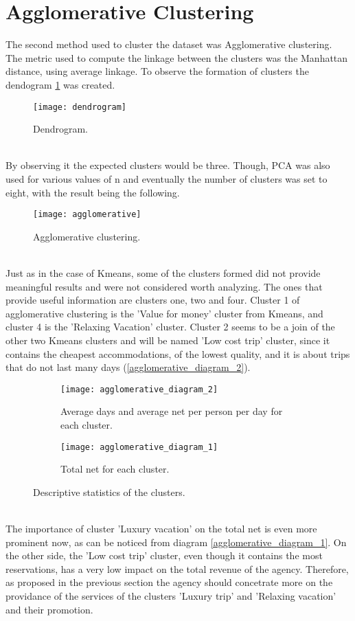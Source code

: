 \section{Agglomerative Clustering}
The second method used to cluster the dataset was Agglomerative clustering. The metric used to compute the linkage between the clusters was the Manhattan distance, using average linkage. To observe the formation of clusters the dendogram \ref{fig:dendrogram} was created. \\
\begin{figure}[ht]
\centering
\texttt{[image: dendrogram]}
\caption{Dendrogram.}
\label{fig:dendrogram}
\end{figure}
\\
 By observing it the expected clusters would be three. Though, PCA was also used for various values of n and eventually the number of clusters was set to eight, with the result being the following. \\
\begin{figure}[ht]
\centering
\texttt{[image: agglomerative]}
\caption{Agglomerative clustering.}
\label{fig:agglomerative}
\end{figure}
\\
Just as in the case of Kmeans, some of the clusters formed did not provide meaningful results and were not considered worth analyzing. The ones that provide useful information are clusters one, two and four. Cluster 1 of agglomerative clustering is the 'Value for money' cluster from Kmeans, and cluster 4 is the 'Relaxing Vacation' cluster. Cluster 2 seems to be a join of the other two Kmeans clusters and will be named 'Low cost trip' cluster, since it contains the cheapest accommodations, of the lowest quality, and it is about trips that do not last many days (\ref{agglomerative_diagram_2}). 
\begin{figure}[ht]
\centering
\begin{subfigure}{.5\textwidth}
\centering
\texttt{[image: agglomerative\_diagram\_2]}
\caption{Average days and average net per person per day for each cluster.}
\label{fig:agglomerative1}
\end{subfigure}%
\begin{subfigure}{.5\textwidth}
\centering
\texttt{[image: agglomerative\_diagram\_1]}
\caption{Total net for each cluster.}
\label{fig:agglomerative2}
\end{subfigure}%
\caption{Descriptive statistics of the clusters.}
\label{fig:agglomerative_descriptives}
\end{figure}
\\
The importance of cluster 'Luxury vacation' on the total net is even more prominent now, as can be noticed from diagram \ref{agglomerative_diagram_1}. On the other side, the 'Low cost trip' cluster, even though it contains the most reservations, has a very low impact on the total revenue of the agency. Therefore, as proposed in the previous section the agency should concetrate more on the providance of the services of the clusters 'Luxury trip' and 'Relaxing vacation' and their promotion.